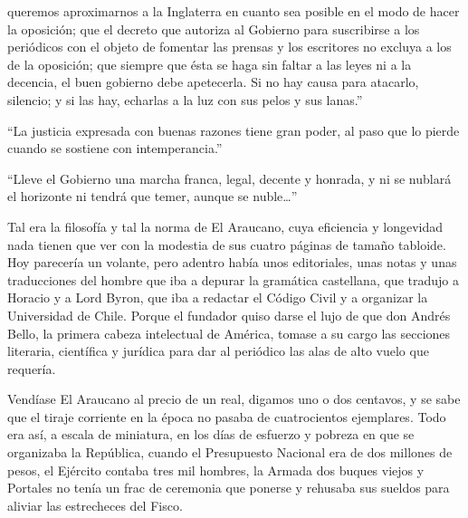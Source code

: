 \documentclass[10pt,twoside,openright]{memoir}
\begin{document}
queremos aproximarnos a la
Inglaterra en cuanto sea posible en el modo de hacer la oposición; que
el decreto que autoriza al Gobierno para suscribirse a los periódicos
con el objeto de fomentar las prensas y los escritores no excluya a los
de la oposición; que siempre que ésta se haga sin faltar a las leyes ni
a la decencia, el buen gobierno debe apetecerla. Si no hay causa para
atacarlo, silencio; y si las hay, echarlas a la luz con sus pelos y sus
lanas.''

``La justicia expresada con buenas razones tiene gran poder, al paso que
lo pierde cuando se sostiene con intemperancia.''

``Lleve el Gobierno una marcha franca, legal, decente y honrada, y ni se
nublará el horizonte ni tendrá que temer, aunque se nuble\ldots''


 Tal era la filosofía y tal la norma
de El Araucano, cuya eficiencia y longevidad nada tienen que ver con la
modestia de sus cuatro páginas de tamaño tabloide. Hoy parecería un
volante, pero adentro había unos editoriales, unas notas y unas
traducciones del hombre que iba a depurar la gramática castellana, que
tradujo a Horacio y a Lord Byron, que iba a redactar el Código Civil y a
organizar la Universidad de Chile. Porque el fundador quiso darse el
lujo de que don Andrés Bello, la primera cabeza intelectual de América,
tomase a su cargo las secciones literaria, científica y jurídica para
dar al periódico las alas de alto vuelo que requería.

Vendíase El Araucano al precio de un real, digamos uno o dos centavos, y
se sabe que el tiraje corriente en la época no pasaba de cuatrocientos
ejemplares. Todo era así, a escala de miniatura, en los días de esfuerzo
y pobreza en que se organizaba la República, cuando el Presupuesto
Nacional era de dos millones de pesos, el Ejército contaba tres mil
hombres, la Armada dos buques viejos y Portales no tenía un frac de
ceremonia que ponerse y rehusaba sus sueldos para aliviar las
estrecheces del Fisco.
\end{document}
